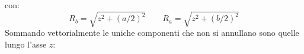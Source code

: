 \begin{Es}
\begin{figure}[htbp]
    \qquad
  \end{figure}
  con:
  \[
    R_b = \sqrt{z^2+(a/2)^2}\qquad R_a = \sqrt{z^2+(b/2)^2}
  \]
  Sommando vettorialmente le uniche componenti che non si annullano sono quelle lungo l'asse $z$:

\end{Es}
